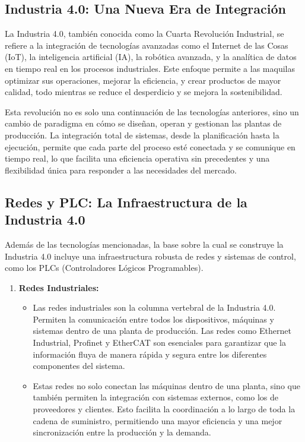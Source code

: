 \documentclass[
  10pt,
  letterpaper,
]{book}
\providecommand{\tightlist}{%
  \setlength{\itemsep}{0pt}\setlength{\parskip}{0pt}}\usepackage{longtable,booktabs,array}
\begin{document}
\subsection{Industria 4.0: Una Nueva Era de
Integración}\label{industria-4.0-una-nueva-era-de-integraciuxf3n}

La Industria 4.0, también conocida como la Cuarta Revolución Industrial,
se refiere a la integración de tecnologías avanzadas como el Internet de
las Cosas (IoT), la inteligencia artificial (IA), la robótica avanzada,
y la analítica de datos en tiempo real en los procesos industriales.
Este enfoque permite a las maquilas optimizar sus operaciones, mejorar
la eficiencia, y crear productos de mayor calidad, todo mientras se
reduce el desperdicio y se mejora la sostenibilidad.

Esta revolución no es solo una continuación de las tecnologías
anteriores, sino un cambio de paradigma en cómo se diseñan, operan y
gestionan las plantas de producción. La integración total de sistemas,
desde la planificación hasta la ejecución, permite que cada parte del
proceso esté conectada y se comunique en tiempo real, lo que facilita
una eficiencia operativa sin precedentes y una flexibilidad única para
responder a las necesidades del mercado.

\subsection{Redes y PLC: La Infraestructura de la Industria
4.0}\label{redes-y-plc-la-infraestructura-de-la-industria-4.0}

Además de las tecnologías mencionadas, la base sobre la cual se
construye la Industria 4.0 incluye una infraestructura robusta de redes
y sistemas de control, como los PLCs (Controladores Lógicos
Programables).

\begin{enumerate}
\def\labelenumi{\arabic{enumi}.}
\tightlist
\item
  \textbf{Redes Industriales:}

  \begin{itemize}
  \tightlist
  \item
    Las redes industriales son la columna vertebral de la Industria 4.0.
    Permiten la comunicación entre todos los dispositivos, máquinas y
    sistemas dentro de una planta de producción. Las redes como Ethernet
    Industrial, Profinet y EtherCAT son esenciales para garantizar que
    la información fluya de manera rápida y segura entre los diferentes
    componentes del sistema.
  \item
    Estas redes no solo conectan las máquinas dentro de una planta, sino
    que también permiten la integración con sistemas externos, como los
    de proveedores y clientes. Esto facilita la coordinación a lo largo
    de toda la cadena de suministro, permitiendo una mayor eficiencia y
    una mejor sincronización entre la producción y la demanda.
  \end{itemize}
\end{enumerate}
\end{document}
